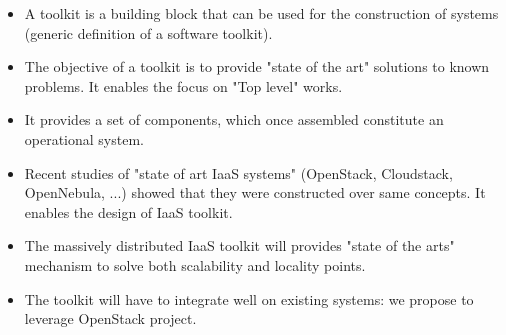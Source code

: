 \begin{itemize}

	\item A toolkit is a building block that can be used for the construction of
	systems (generic definition of a software toolkit).

	\item The objective of a toolkit is to provide "state of the art" solutions
	to known problems. It enables the focus on "Top level" works.

	\item It provides a set of components, which once assembled constitute an 
	operational system.

	\item Recent studies of "state of art IaaS systems" (OpenStack, Cloudstack,
	OpenNebula, ...) showed that they were constructed over same concepts. It 
	enables the design of IaaS toolkit.

	\item The massively distributed IaaS toolkit will provides "state of the 
	arts" mechanism to solve both scalability and locality points.

	\item The toolkit will have to integrate well on existing systems: we 
	propose to leverage OpenStack project.

\end{itemize}
